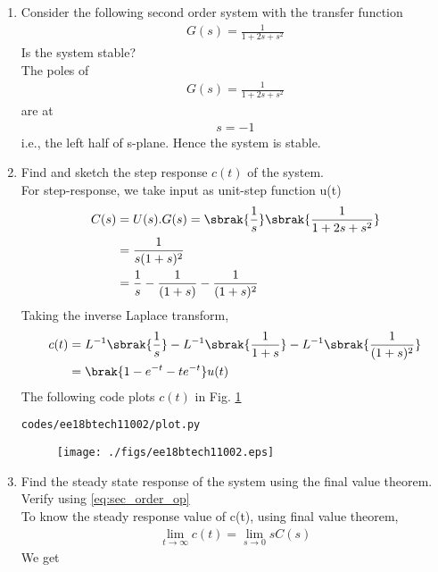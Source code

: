 \begin{enumerate}[label=\thesection.\arabic*.,ref=\thesection.\theenumi]
\item
Consider the following second order system with the transfer function
\begin{align}
G(s) = \frac{1}{1+2s+s^2}
\end{align}
Is the system stable? 
\\
\solution The poles of 
\begin{align}
G(s) = \frac{1}{1+2s+s^2}
\end{align}
are at 
\begin{align}
s = -1
\end{align}
i.e.,  the left half of s-plane.  Hence the system is stable.
\item Find and sketch the step response $c(t)$ of the system.
\\
\solution 
For step-response, we take input as unit-step function u(t)
\begin{align}
C(s) &= U(s).G(s) = \sbrak{\frac{1}{s}} \sbrak{\frac{1}{1+2s+s^2}}
\\
&= \frac{1}{s(1+s)^2}
\\
&= \frac{1}{s} - \frac{1}{(1+s)} - \frac{1}{(1+s)^2}
\end{align}
%
Taking the inverse Laplace transform,
%
\begin{align}
c(t) &= L^{-1} \sbrak{ \frac{1}{s}} - L^{-1}\sbrak{\frac{1}{1+s}} - L^{-1}\sbrak{\frac{1}{(1+s)^2}} 
\\
&= \brak{1 - e^{-t} - te^{-t}}  u(t)
\label{eq:sec_order_op}
\end{align}
%
The following code plots $c(t)$ in Fig. \ref{fig:sec_order}
\begin{lstlisting}
codes/ee18btech11002/plot.py
\end{lstlisting}
\begin{figure}
\centering
\texttt{[image: ./figs/ee18btech11002.eps]}
\caption{}
\label{fig:sec_order}
\end{figure}
\item Find the steady state response of the system using the final value theorem.  Verify using 
\ref{eq:sec_order_op}
\\
\solution 
To know the steady response value of c(t), using final value theorem,
\begin{align}
\lim_{t\to\infty} c(t) = \lim_{s\to 0} sC(s) 
\end{align}
We get
\begin{align}

\end{align}
\end{enumerate}
